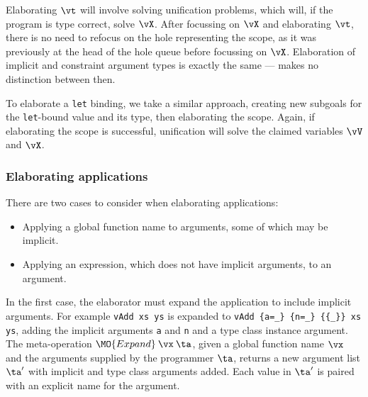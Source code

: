 
Elaborating $\vt$ will involve solving unification problems, which will, if the
program is type correct, solve $\vX$. After focussing on $\vX$ and elaborating
$\vt$, there is no need to refocus on the hole representing the scope, as it was
previously at the head of the hole queue before focussing on $\vX$.
Elaboration of implicit and constraint
argument types is exactly the same --- \TT{} makes no distinction between then.

To elaborate a \texttt{let} binding, we take a similar approach, creating new subgoals
for the \texttt{let}-bound value and its type, then elaborating the scope. Again,
if elaborating the scope is successful, unification will solve the claimed variables
$\vV$ and $\vX$.

\subsubsection{Elaborating applications}

There are two cases to consider when elaborating applications:

\begin{itemize}
\item Applying a global function name to arguments, some of which may be implicit.
\item Applying an expression, which does not have implicit arguments, to an argument.
\end{itemize}

In the first case, the elaborator must expand the application to include implicit arguments.
For example \texttt{vAdd xs ys} is expanded to
\texttt{vAdd \{a=\_\} \{n=\_\} \{\{\_\}\} xs ys}, adding the implicit arguments
\texttt{a} and \texttt{n} and a type class instance argument. The meta-operation
$\MO{Expand}\:\vx\:\ta$, given a global function name $\vx$ and the
arguments supplied by the programmer $\ta$, returns a new argument list
$\ta'$ with implicit and type class arguments added. Each value in
$\ta'$ is paired with an explicit name for the argument.


